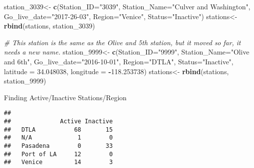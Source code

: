 \documentclass[]{article}
\newenvironment{Shaded}{\begin{snugshade}}{\end{snugshade}}
\newcommand{\KeywordTok}[1]{\textcolor[rgb]{0.13,0.29,0.53}{\textbf{#1}}}
\newcommand{\DataTypeTok}[1]{\textcolor[rgb]{0.13,0.29,0.53}{#1}}
\newcommand{\DecValTok}[1]{\textcolor[rgb]{0.00,0.00,0.81}{#1}}
\newcommand{\FloatTok}[1]{\textcolor[rgb]{0.00,0.00,0.81}{#1}}
\newcommand{\StringTok}[1]{\textcolor[rgb]{0.31,0.60,0.02}{#1}}
\newcommand{\CommentTok}[1]{\textcolor[rgb]{0.56,0.35,0.01}{\textit{#1}}}
\newcommand{\OperatorTok}[1]{\textcolor[rgb]{0.81,0.36,0.00}{\textbf{#1}}}
\newcommand{\NormalTok}[1]{#1}
\begin{document}
\begin{Shaded}
\begin{Highlighting}[]
\NormalTok{station_}\DecValTok{3039}\NormalTok{<-}\StringTok{ }\KeywordTok{c}\NormalTok{(}\DataTypeTok{Station_ID=}\StringTok{"3039"}\NormalTok{,}
                 \DataTypeTok{Station_Name=}\StringTok{"Culver and Washington"}\NormalTok{,}
                 \DataTypeTok{Go_live_date=}\StringTok{"2017-26-03"}\NormalTok{,}
                 \DataTypeTok{Region=}\StringTok{"Venice"}\NormalTok{,}
                 \DataTypeTok{Status=}\StringTok{"Inactive"}\NormalTok{)}
\NormalTok{stations<-}\StringTok{ }\KeywordTok{rbind}\NormalTok{(stations, station_}\DecValTok{3039}\NormalTok{)}

\CommentTok{# This station is the same as the Olive and 5th station, but it moved so far, it needs a new name.}
\NormalTok{station_}\DecValTok{9999}\NormalTok{<-}\StringTok{ }\KeywordTok{c}\NormalTok{(}\DataTypeTok{Station_ID=}\StringTok{"9999"}\NormalTok{,}
                 \DataTypeTok{Station_Name=}\StringTok{"Olive and 6th"}\NormalTok{,}
                 \DataTypeTok{Go_live_date=}\StringTok{"2016-10-01"}\NormalTok{,}
                 \DataTypeTok{Region=}\StringTok{"DTLA"}\NormalTok{,}
                 \DataTypeTok{Status=}\StringTok{"Inactive"}\NormalTok{,}
                 \DataTypeTok{latitude =} \FloatTok{34.048038}\NormalTok{,}
                 \DataTypeTok{longitude =} \OperatorTok{-}\FloatTok{118.253738}\NormalTok{)}
\NormalTok{stations<-}\StringTok{ }\KeywordTok{rbind}\NormalTok{(stations, station_}\DecValTok{9999}\NormalTok{)}
\end{Highlighting}
\end{Shaded}

Finding Active/Inactive Stations/Region

\begin{Shaded}
\end{Shaded}

\begin{verbatim}
##             
##              Active Inactive
##   DTLA           68       15
##   N/A             1        0
##   Pasadena        0       33
##   Port of LA     12        0
##   Venice         14        3
\end{verbatim}

\begin{Shaded}
\end{Shaded}
\end{document}
